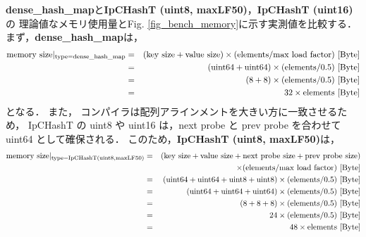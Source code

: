 {\bf dense\_hash\_map}と{\bf IpCHashT (uint8, maxLF50)}，{\bf IpCHashT (uint16)}の
理論値なメモリ使用量とFig. \ref{fig_bench_memory}に示す実測値を比較する．
まず，{\bf dense\_hash\_map}は，
\begin{eqnarray*}
  {\rm memory\ size|_{type=dense\_hash\_map}} &=& ({\rm key\ size} + {\rm value\ size}) \times ({\rm elements} / {\rm max\ load\ factor}) {\rm\ [Byte]}\\
  &=& ({\rm uint64} + {\rm uint64}) \times ({\rm elements} / 0.5) {\rm\ [Byte]}\\
  &=& (8 + 8) \times ({\rm elements} / 0.5) {\rm\ [Byte]}\\
  &=& 32 \times {\rm elements} {\rm\ [Byte]}
\end{eqnarray*}
となる．
また，
コンパイラは配列アラインメントを大きい方に一致させるため，
IpCHashT の uint8 や uint16 は，next probe と prev probe を合わせて uint64 として確保される．
このため，{\bf IpCHashT (uint8, maxLF50)}は，
\begin{eqnarray*}
  {\rm memory\ size|_{type=IpCHashT (uint8, maxLF50)}} &=& ({\rm key\ size} + {\rm value\ size} + {\rm next\ probe\ size} + {\rm prev\ probe\ size})\\
                                              & & \times ({\rm elements} / {\rm max\ load\ factor}) {\rm\ [Byte]}\\
  &=& ({\rm uint64} + {\rm uint64} + {\rm uint8} + {\rm uint8}) \times ({\rm elements} / 0.5) {\rm\ [Byte]}\\
  &=& ({\rm uint64} + {\rm uint64} + {\rm uint64}) \times ({\rm elements} / 0.5) {\rm\ [Byte]}\\
  &=& (8 + 8 + 8) \times ({\rm elements} / 0.5) {\rm\ [Byte]}\\
  &=& 24 \times ({\rm elements} / 0.5) {\rm\ [Byte]}\\
  &=& 48 \times {\rm elements} {\rm\ [Byte]}
\end{eqnarray*}
